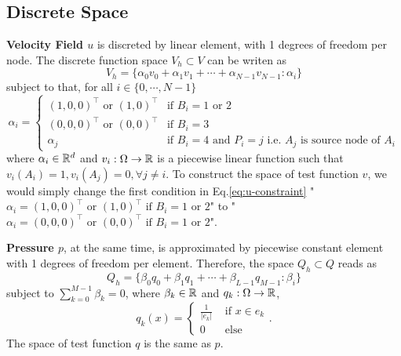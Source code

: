 \subsection{Discrete Space}
\textbf{Velocity Field $u$} is discreted by linear element, with 1 degrees of freedom per node. 
The discrete function space $V_h\subset V$ can be writen as
\begin{equation}\label{eq:u-space}
  V_h=\{\alpha_0v_0+\alpha_1v_1+\cdots+\alpha_{N-1}v_{N-1}:\alpha_i\}
\end{equation}
subject to that, for all $i\in\{0,\cdots,N-1\}$
\begin{equation}\label{eq:u-constraint}
  \alpha_i=\left\{
  \begin{array}{ll}
    (1,0,0)^\top \text{ or } (1,0)^\top & \text{if } B_i=1\text{ or }2 \\
    (0,0,0)^\top \text{ or } (0,0)^\top & \text{if } B_i=3 \\
    \alpha_j & \text{if } B_i=4 \text{ and } P_i=j \text{ i.e. } A_j \text{ is source node of } A_i
  \end{array}
  \right.
\end{equation}
where $\alpha_i\in\mathbb{R}^d$ and $v_i:\Omega\to\mathbb{R}$ is a 
piecewise linear function such that $v_i(A_i)=1,v_i(A_j)=0,\forall j\neq i$.
To construct the space of test function $v$, we would simply change the first condition in 
Eq.\eqref{eq:u-constraint} "$\alpha_i=(1,0,0)^\top \text{ or } (1,0)^\top \text{ if } B_i=1\text{ or }2$" to 
"$\alpha_i=(0,0,0)^\top \text{ or } (0,0)^\top \text{ if } B_i=1\text{ or }2$".

\textbf{Pressure $p$}, at the same time, is approximated by piecewise constant element 
with 1 degrees of freedom per element. Therefore, the space $Q_h\subset Q$ reads as
\begin{equation}\label{eq:p-space}
  Q_h=\{\beta_0q_0+\beta_1q_1+\cdots+\beta_{L-1}q_{M-1}:\beta_i\}
\end{equation}
subject to $\sum_{k=0}^{M-1}\beta_k=0$, where $\beta_k\in\mathbb{R}$ and $q_k:\Omega\to\mathbb{R}$,
\[
  q_k(x)=\left\{
    \begin{array}{ll}
      \frac{1}{|e_k|} & \text{ if } x\in e_k \\
      0               & \text{ else}
    \end{array}
    \right..
  \]
The space of test function $q$ is the same as $p$.

